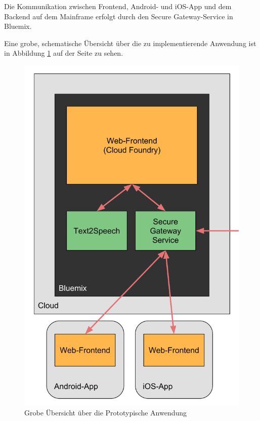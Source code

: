 Die Kommunikation zwischen Frontend, Android- und iOS-App und dem Backend auf dem Mainframe erfolgt durch
den Secure Gateway-Service in Bluemix.

Eine grobe, schematische Übersicht über die zu implementierende Anwendung ist in Abbildung \ref{fig:architektur_clouduebersicht}
auf der Seite \pageref{fig:architektur_clouduebersicht} zu sehen.

\begin{figure}[h]
  \centering
    \includegraphics[scale=0.5]{images/kapitel_4/architektur_clouduebersicht.pdf}
  \caption{Grobe Übersicht über die Prototypische Anwendung}
  \label{fig:architektur_clouduebersicht}
\end{figure}